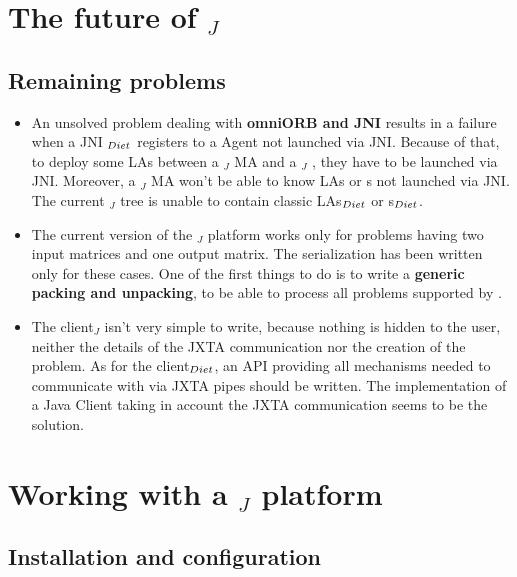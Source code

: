 \section{The future of \diet$_{J}$}
\label{sec:future}

\subsection{Remaining problems}
\label{ssec:remainingpbs}

\begin{itemize}
\item{An unsolved problem dealing with \textbf{omniORB and JNI}
    results in a failure when a JNI \sed$_{{\sc Diet}}$ registers to a \diet
    Agent not launched via JNI. Because of that, to deploy some LAs
    between a \diet$_{J}$ MA and a \diet$_{J}$ \sed, they have to
    be launched via JNI.  Moreover, a \diet$_{J}$ MA won't be able
    to know LAs or {\sed}s not launched via JNI.  The current
    \diet$_{J}$ tree is unable to contain classic LAs$_{{\sc Diet}}$ or
    {\sed}s$_{{\sc Diet}}$.}
  
\item{The current version of the \diet$_{J}$ platform works only for
    problems having two input matrices and one output matrix. The
    serialization has been written only for these cases. One of the
    first things to do is to write a \textbf{generic packing and
      unpacking}, to be able to process all problems supported
    by \diet.}
\item{The client$_{J}$ isn't very simple to write, because nothing is
    hidden to the user, neither the details of the JXTA communication
    nor the creation of the problem. As for the client$_{{\sc Diet}}$, an
    API providing all mechanisms needed to communicate with \diet via
    JXTA pipes should be written. The implementation of a Java Client
    taking in account the JXTA communication seems to be the solution.}

\end{itemize}

\section{Working with a \diet$_{J}$ platform}
\label{sec:workwithjxta}

\subsection{Installation and configuration}
\label{ssec:installjxta}

